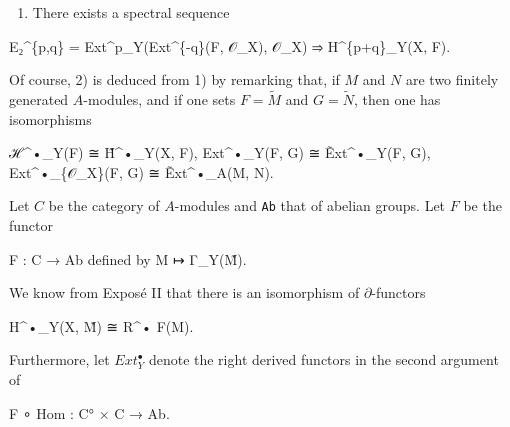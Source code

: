 \documentclass[
]{article}
\newenvironment{Shaded}{}{}
\newcommand{\NormalTok}[1]{#1}
\providecommand{\tightlist}{%
  \setlength{\itemsep}{0pt}\setlength{\parskip}{0pt}}
\begin{document}
\begin{enumerate}
\def\labelenumi{\arabic{enumi}.}
\tightlist
\item
  There exists a spectral sequence
\end{enumerate}

\begin{Shaded}
\begin{Highlighting}[]
\NormalTok{E₂\^{}\{p,q\} = Ext\^{}p\_Y(Ext\^{}\{{-}q\}(F, 𝒪\_X), 𝒪\_X) ⇒ H\^{}\{p+q\}\_Y(X, F).}
\end{Highlighting}
\end{Shaded}

Of course, 2) is deduced from 1) by remarking that, if \(M\) and \(N\)
are two finitely generated \(A\)-modules, and if one sets
\(F = \tilde{M}\) and \(G = \tilde{N}\), then one has isomorphisms

\begin{Shaded}
\begin{Highlighting}[]
\NormalTok{ℋ\^{}•\_Y(F) ≅ H̃\^{}•\_Y(X, F),}
\NormalTok{Ext\^{}•\_Y(F, G) ≅ Ẽxt\^{}•\_Y(F, G),}
\NormalTok{Ext\^{}•\_\{𝒪\_X\}(F, G) ≅ Ẽxt\^{}•\_A(M, N).}
\end{Highlighting}
\end{Shaded}

Let \(C\) be the category of \(A\)-modules and \texttt{Ab} that of
abelian groups. Let \(F\) be the functor

\begin{Shaded}
\begin{Highlighting}[]
\NormalTok{F : C → Ab    defined by    M ↦ Γ\_Y(M̃).}
\end{Highlighting}
\end{Shaded}

We know from Exposé II that there is an isomorphism of
\(\partial\)-functors

\begin{Shaded}
\begin{Highlighting}[]
\NormalTok{H\^{}•\_Y(X, M̃) ≅ R\^{}• F(M).}
\end{Highlighting}
\end{Shaded}

Furthermore, let \(Ext^{\bullet}_{Y}\) denote the right derived functors
in the second argument of

\begin{Shaded}
\begin{Highlighting}[]
\NormalTok{F ∘ Hom : C° × C → Ab.}
\end{Highlighting}
\end{Shaded}
\end{document}
